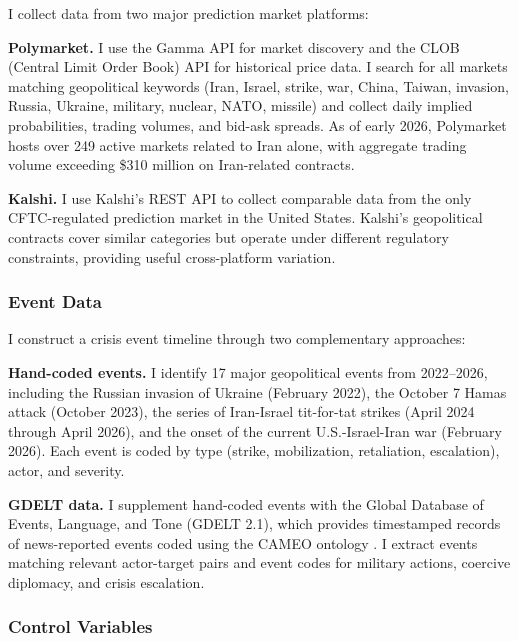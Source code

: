 \documentclass[12pt]{article}
\begin{document}
I collect data from two major prediction market platforms:

\textbf{Polymarket.} I use the Gamma API for market discovery and the CLOB (Central Limit Order Book) API for historical price data. I search for all markets matching geopolitical keywords (Iran, Israel, strike, war, China, Taiwan, invasion, Russia, Ukraine, military, nuclear, NATO, missile) and collect daily implied probabilities, trading volumes, and bid-ask spreads. As of early 2026, Polymarket hosts over 249 active markets related to Iran alone, with aggregate trading volume exceeding \$310 million on Iran-related contracts.

\textbf{Kalshi.} I use Kalshi's REST API to collect comparable data from the only CFTC-regulated prediction market in the United States. Kalshi's geopolitical contracts cover similar categories but operate under different regulatory constraints, providing useful cross-platform variation.

\subsubsection{Event Data}

I construct a crisis event timeline through two complementary approaches:

\textbf{Hand-coded events.} I identify 17 major geopolitical events from 2022--2026, including the Russian invasion of Ukraine (February 2022), the October 7 Hamas attack (October 2023), the series of Iran-Israel tit-for-tat strikes (April 2024 through April 2026), and the onset of the current U.S.-Israel-Iran war (February 2026). Each event is coded by type (strike, mobilization, retaliation, escalation), actor, and severity.

\textbf{GDELT data.} I supplement hand-coded events with the Global Database of Events, Language, and Tone (GDELT 2.1), which provides timestamped records of news-reported events coded using the CAMEO ontology \citep{leetaru2013}. I extract events matching relevant actor-target pairs and event codes for military actions, coercive diplomacy, and crisis escalation.

\subsubsection{Control Variables}
\end{document}
